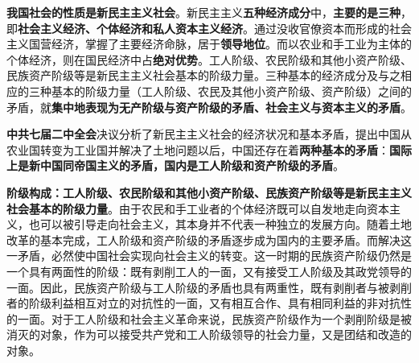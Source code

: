 \textbf{我国社会的性质是新民主主义社会}。新民主主义\textbf{五种经济成分}中，\textbf{主要的是三种}，即\textbf{社会主义经济、个体经济和私人资本主义经济}。通过没收官僚资本而形成的社会主义国营经济，掌握了主要经济命脉，居于\textbf{领导地位}。而以农业和手工业为主体的个体经济，则在国民经济中占\textbf{绝对优势}。工人阶级、农民阶级和其他小资产阶级、民族资产阶级等是新民主主义社会基本的阶级力量。三种基本的经济成分及与之相应的三种基本的阶级力量（工人阶级、农民及其他小资产阶级、资产阶级）之间的矛盾，就\textbf{{集中地表现为无产阶级与资产阶级的矛盾、社会主义与资本主义的矛盾}}{。}{}

\textbf{中共七届二中全会}决议分析了新民主主义社会的经济状况和基本矛盾，提出中国从农业国转变为工业国并解决了土地问题以后，中国还存在着\textbf{两种基本的矛盾}：\textbf{国际上是新中国同帝国主义的矛盾，国内是工人阶级和资产阶级的矛盾}。

\textbf{{阶级构成}：工人阶级、农民阶级和其他小资产阶级、民族资产阶级等是新民主主义社会基本的阶级力量}{。}由于农民和手工业者的个体经济既可以自发地走向资本主义，也可以被引导走向社会主义，其本身并不代表一种独立的发展方向{。随着土地改革的基本完成，}工人阶级和资产阶级的矛盾逐步成为国内的主要矛盾。而解决这一矛盾，必然使中国社会实现向社会主义的转变{。}这一时期的民族资产阶级仍然是一个具有两面性的阶级：既有剥削工人的一面，又有接受工人阶级及其政党领导的一面{。{因此}，}民族资产阶级与工人阶级的矛盾也具有两重性，既有剥削者与被剥削者的阶级利益相互对立的对抗性的一面，又有相互合作、具有相同利益的非对抗性的一面{。对于工人阶级和社会主义革命来说，民族资产阶级作为一个剥削阶级是被消灭的对象，作为可以接受共产党和工人阶级领导的社会力量，又是团结和改造的对象。}
